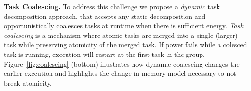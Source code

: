 
\textbf{Task Coalescing.} To address this challenge we propose a
\emph{dynamic} task decomposition approach, that accepts any static
decomposition and opportunistically coalesces tasks at runtime when
there is sufficient energy. \emph{Task coalescing} is a mechanism where
atomic tasks are merged into a single (larger) task while preserving
atomicity of the merged task. If power fails while a colesced task is
running, execution will restart at the first task in the group.
Figure~\ref{fig:coalescing} (bottom) illustrates how dynamic coalescing
changes the earlier execution and highlights the change in memory model
necessary to not break atomicity.

